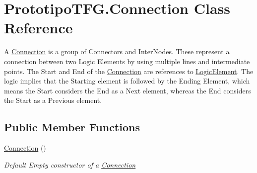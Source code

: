 \hypertarget{class_prototipo_t_f_g_1_1_connection}{}\section{Prototipo\+T\+F\+G.\+Connection Class Reference}
\label{class_prototipo_t_f_g_1_1_connection}


A \hyperlink{class_prototipo_t_f_g_1_1_connection}{Connection} is a group of Connectors and Inter\+Nodes. These represent a connection between two Logic Elements by using multiple lines and intermediate points. The Start and End of the \hyperlink{class_prototipo_t_f_g_1_1_connection}{Connection} are references to \hyperlink{class_prototipo_t_f_g_1_1_logic_element}{Logic\+Element}. The logic implies that the Starting element is followed by the Ending Element, which means the Start considers the End as a Next element, whereas the End considers the Start as a Previous element.  


\subsection*{Public Member Functions}
\begin{DoxyCompactItemize}
\item 
\hyperlink{class_prototipo_t_f_g_1_1_connection_a50cfd65759c1f43febfd953d19f3aff5}{Connection} ()
\begin{DoxyCompactList}\small\item\em Default Empty constructor of a \hyperlink{class_prototipo_t_f_g_1_1_connection}{Connection} \end{DoxyCompactList}\end{DoxyCompactItemize}
